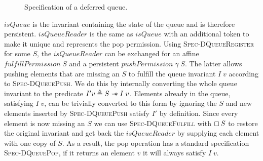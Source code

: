 \begin{figure}[ht]
  \caption{Specification of a deferred queue.}
  \label{fig:dm-deferred-spec}
\end{figure}

\(isQueue\) is the invariant containing the state of the queue and is therefore persistent.
\(isQueueReader\) is the same as \(isQueue\) with an additional token to make it unique and represents the pop permission.
Using \textsc{Spec-DQueueRegister} for some \(S\), the \(isQueueReader\) can be exchanged for an affine \(fulfillPermission\; S\) and a persistent \(pushPermission\; \gamma\; S\).
The latter allows pushing elements that are missing an \(S\) to fulfill the queue invariant \(I\; v\) according to \textsc{Spec-DQueuePush}.
We do this by internally converting the whole queue invariant to the predicate \(I' v \triangleq S \mathrel{-\!\!\ast} I\; v\).
Elements already in the queue, satisfying \(I\; v\), can be trivially converted to this form by ignoring the \(S\) and new elements inserted by \textsc{Spec-DQueuePush} satisfy \(I'\) by definition.
Since every element is now missing an \(S\) we can use \textsc{Spec-DQueueFulfill} with \(\mathop{\boxempty} S\) to restore the original invariant and get back the \(isQueueReader\) by supplying each element with one copy of \(S\).
As a result, the pop operation has a standard specification \textsc{Spec-DQueuePop}, if it returns an element \(v\) it will always satisfy \(I\; v\).


